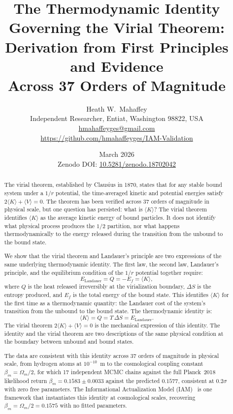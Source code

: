 \documentclass[12pt,a4paper]{article}
\title{\textbf{The Thermodynamic Identity Governing the Virial Theorem:\\
Derivation from First Principles and Evidence\\
Across 37 Orders of Magnitude}}
\author{Heath W.\ Mahaffey\\
\small Independent Researcher, Entiat, Washington 98822, USA\\
\small \href{mailto:hmahaffeyges@gmail.com}{hmahaffeyges@gmail.com}\\
\small \url{https://github.com/hmahaffeyges/IAM-Validation}}
\date{March 2026\\
\small Zenodo DOI:
\href{https://doi.org/10.5281/zenodo.18702042}{10.5281/zenodo.18702042}}
\begin{document}
\maketitle

\begin{abstract}
The virial theorem, established by Clausius in 1870, states that for any
stable bound system under a $1/r$ potential, the time-averaged kinetic and
potential energies satisfy $2\langle K \rangle + \langle V \rangle = 0$.
The theorem has been verified across 37 orders of magnitude in physical
scale, but one question has persisted: what is $\langle K \rangle$?
The virial theorem identifies $\langle K \rangle$ as the average kinetic
energy of bound particles. It does not identify what physical process
produces the $1/2$ partition, nor what happens thermodynamically to the
energy released during the transition from the unbound to the bound state.

We show that the virial theorem and Landauer's principle are two
expressions of the same underlying thermodynamic identity. The first law,
the second law, Landauer's principle, and the equilibrium condition of the
$1/r$ potential together require:
\begin{equation*}
E_\mathrm{Landauer} = Q = -E_f = \langle K \rangle,
\end{equation*}
where $Q$ is the heat released irreversibly at the virialization boundary,
$\Delta S$ is the entropy produced, and $E_f$ is the total energy of the
bound state. This identifies $\langle K \rangle$ for the first time as a
thermodynamic quantity: the Landauer cost of the system's transition from
the unbound to the bound state. The thermodynamic identity is:
\begin{equation}
\langle K \rangle = Q = T\,\Delta S = E_\mathrm{Landauer}.
\label{eq:identity_abstract}
\end{equation}
The virial theorem $2\langle K \rangle + \langle V \rangle = 0$ is the
mechanical expression of this identity. The identity and the virial theorem
are two descriptions of the same physical condition at the boundary between
unbound and bound states.

The data are consistent with this identity across 37 orders of magnitude
in physical scale, from hydrogen atoms at $10^{-10}$~m to the
cosmological coupling constant $\beta_m = \Omega_m/2$, for which 17
independent MCMC chains against the full Planck~2018 likelihood
\citep{PlanckVI2020} return $\beta_m = 0.1583 \pm 0.0033$ against the
predicted $0.1577$, consistent at $0.2\sigma$ with zero free parameters.
The Informational Actualization Model (IAM)~\citep{IAM_theory} is one
framework that instantiates this identity at cosmological scales,
recovering $\beta_m = \Omega_m/2 = 0.1575$ with no fitted parameters.


\end{abstract}
\end{document}
